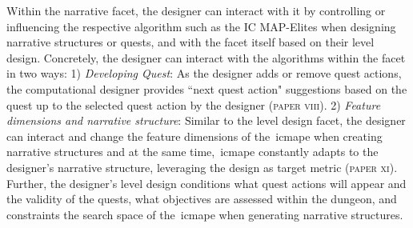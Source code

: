 Within the narrative facet, the designer can interact with it by controlling or influencing the respective algorithm such as the IC MAP-Elites when designing narrative structures or quests, and with the facet itself based on their level design. Concretely, the designer can interact with the algorithms within the facet in two ways: 1) \emph{Developing Quest}: As the designer adds or remove quest actions, the computational designer provides ``next quest action" suggestions based on the quest up to the selected quest action by the designer (\textsc{paper viii}). 2) \emph{Feature dimensions and narrative structure}: Similar to the level design facet, the designer can interact and change the feature dimensions of the~\acrshort{icmape} when creating narrative structures and at the same time,~\acrshort{icmape} constantly adapts to the designer's narrative structure, leveraging the design as target metric (\textsc{paper xi}). Further, the designer's level design conditions what quest actions will appear and the validity of the quests, what objectives are assessed within the dungeon, and constraints the search space of the~\acrshort{icmape} when generating narrative structures.








